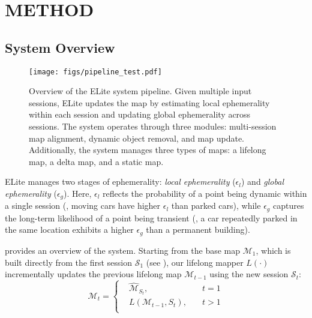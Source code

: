 \section{METHOD}
\label{sec:method}

\subsection{System Overview}
\label{subsec:system_overview}

\begin{figure}[!t]
    \centering
    \texttt{[image: figs/pipeline\_test.pdf]}
    \caption{Overview of the ELite system pipeline. Given multiple input sessions, ELite updates the map by estimating local ephemerality within each session and updating global ephemerality across sessions. The system operates through three modules: multi-session map alignment, dynamic object removal, and map update. Additionally, the system manages three types of maps: a lifelong map, a delta map, and a static map.}
    \label{fig:system_overview}
    \vspace{-5mm}
\end{figure}

ELite manages two stages of ephemerality: \emph{local ephemerality} ($\epsilon_{l}$) and \emph{global ephemerality} ($\epsilon_{g}$).
Here, $\epsilon_{l}$ reflects the probability of a point being dynamic within a single session (\eg, moving cars have higher $\epsilon_{l}$ than parked cars), while $\epsilon_{g}$ captures the long-term likelihood of a point being transient (\eg, a car repeatedly parked in the same location exhibits a higher $\epsilon_{g}$ than a permanent building).

 provides an overview of the system.
Starting from the base map $\mathcal{M}_1$, which is built directly from the first session $\mathcal{S}_1$ (see ), our lifelong mapper $L(\cdot)$ incrementally updates the previous lifelong map $\mathcal{M}_{t-1}$ using the new session $\mathcal{S}_t$:
\begin{equation}
\mathcal{M}_{t}= \left\{
\begin{aligned}
&{\hat{\mathcal{M}}_{S_t}}, \quad &t=1 \\
&L(\mathcal{M}_{t-1}, S_{t}), \quad &t>1 \\
\end{aligned}
\right.
\end{equation}

